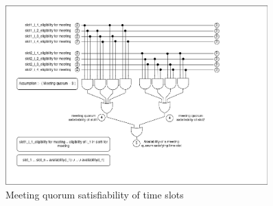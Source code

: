 \begin{figure}[H]
    \centering
    \includegraphics[width=0.9\textwidth]{./image/circuit_diagram/3_quorum_satisfying_slot_selection.png}
    \caption{Meeting quorum satisfiability of time slots}
    \label{fig:meeting quorum satisfiability of time slots}
\end{figure} 

